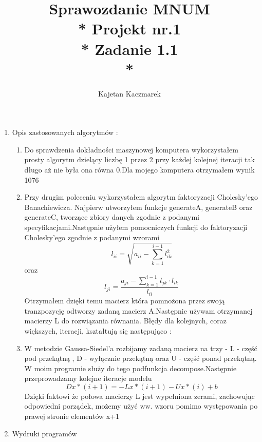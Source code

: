 \documentclass[a4paper, 11pt]{article}
\author{Kajetan Kaczmarek}
\begin{document}
\title{Sprawozdanie MNUM \\* Projekt nr.1 \\* 
Zadanie 1.1 \\*}
\maketitle

\begin{enumerate}

\item Opis zastosowanych algorytmów : 
\begin{enumerate}
\item Do sprawdzenia dokładności maszynowej komputera wykorzystałem prosty algorytm dzielący liczbę 1 przez 2 przy każdej kolejnej iteracji tak długo aż nie była ona równa 0.Dla mojego komputera otrzymałem wynik 1076
\item Przy drugim poleceniu wykorzystałem algorytm faktoryzacji Cholesky'ego Banachiewicza. Najpierw utworzyłem funkcje generateA, generateB oraz generateC, tworzące zbiory danych zgodnie z podanymi specyfikacjami.Następnie użyłem pomocniczych funkcji do faktoryzacji
 Cholesky'ego zgodnie z podanymi wzorami 
 \[ l_{ii} = \sqrt{a_{ii} - \sum_{ k = 1 }^{i-1}l^2_{ik} }  \]
  oraz 
 \[ l_{ji} =
  \dfrac
 { a_{ji} - \sum_{k=1}^{i-1}
  l_{jk} \cdot l_{ik}}{l_{ii} } \]
  Otrzymałem dzięki temu macierz która pomnożona przez swoją tranzpozycję odtworzy zadaną macierz A.Następnie używam otrzymanej macierzy L do rozwiązania równania. Błędy dla kolejnych, coraz większych, iteracji, kształtują się następująco :

\item W metodzie Gaussa-Siedel'a rozbijamy zadaną macierz na trzy - L - część pod przekątną , D - wyłącznie przekątną oraz U - część ponad przekątną. W moim programie służy do tego podfunkcja decompose.Następnie przeprowadzamy kolejne iteracje modelu \[ Dx*{(i+1)} = -Lx*{(i+1)} - Ux*{(i)} + b \] 
Dzięki faktowi że połowa macierzy L jest wypełniona zerami, zachowując odpowiedni porządek, możemy użyć ww. wzoru pomimo występowania po prawej stronie elementów x+1
\end{enumerate}
\item Wydruki programów
\begin{center}


\end{center}
\end{enumerate}
\end{document}

